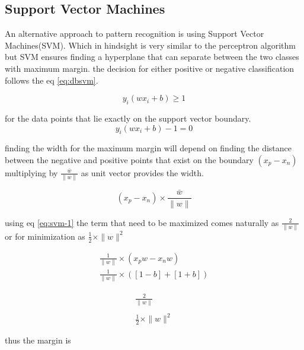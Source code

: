 \documentclass[10pt,twocolumn,letterpaper]{article}
\begin{document}
\subsection{Support Vector Machines}

An alternative approach to pattern recognition is using Support Vector Machines(SVM). Which in hindsight is very similar to the perceptron algorithm but SVM ensures finding a hyperplane  that can separate between the two classes with maximum margin. the decision for either positive or negative classification follows the eq \ref{eq:dbsvm}. 


\begin{equation}
y_{i}\left(w x_{i}+b\right) \geq 1
\label{eq:dbsvm}
\end{equation}

for the data points that lie exactly on the support vector boundary. 
\begin{equation}
y_{i}\left(w x_{i}+b\right)-1=0
\label{eq:svm-1}
\end{equation}

finding the width for the maximum margin will depend on finding the distance between the negative and positive points that exist on the boundary $\left(x_{p}-x_{n}\right)$ multiplying by $\frac{\bar{w}}{\|w\|}$ as unit vector provides the width. 

\begin{equation}
\left(x_{p}-x_{n}\right) \times \frac{\bar{w}}{\|w\|}
\end{equation}

using eq \ref{eq:svm-1} the term that need to be maximized comes naturally as $\frac{2}{\|w\|}$ or for minimization as $\frac{1}{2} \times\|w\|^{2}$

\begin{equation}
\begin{array}{l}
\frac{1}{\|w\|} \times\left(x_{p} w-x_{n} w\right) \\
\frac{1}{\|w\|} \times([1-b]+[1+b])
\end{array}
\end{equation}


\begin{equation}
\begin{array}{l}
\frac{2}{\|w\|} \\ \\
\frac{1}{2} \times\|w\|^{2}
\end{array}
\end{equation}


thus the margin is 
\end{document}
